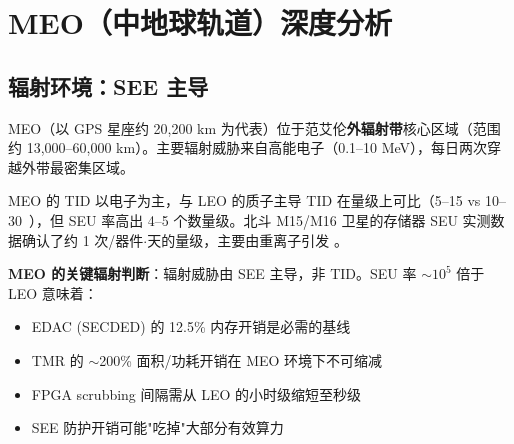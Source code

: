 
\section{MEO（中地球轨道）深度分析}

\subsection{辐射环境：SEE 主导}

MEO（以 GPS 星座约 20,200 km 为代表）位于范艾伦\textbf{外辐射带}核心区域（范围约 13,000--60,000 km）。主要辐射威胁来自高能电子（0.1--10 MeV），每日两次穿越外带最密集区域。

\begin{table}[H]
\centering
\caption{MEO 辐射环境关键参数}
\label{tab:meo-rad}
\end{table}

MEO 的 TID 以电子为主，与 LEO 的质子主导 TID 在量级上可比（5--15 vs 10--30~\kradyr），但 SEU 率高出 4--5 个数量级。北斗 M15/M16 卫星的存储器 SEU 实测数据确认了约 1 次/器件$\cdot$天的量级，主要由重离子引发 \cite{zhang_beidou_seu_2023}。

\textbf{MEO 的关键辐射判断}：辐射威胁由 SEE 主导，非 TID。SEU 率 $\sim 10^{5}$ 倍于 LEO 意味着：
\begin{itemize}
    \item EDAC (SECDED) 的 12.5\% 内存开销是必需的基线
    \item TMR 的 $\sim$200\% 面积/功耗开销在 MEO 环境下不可缩减
    \item FPGA scrubbing 间隔需从 LEO 的小时级缩短至秒级
    \item SEE 防护开销可能"吃掉"大部分有效算力
\end{itemize}

